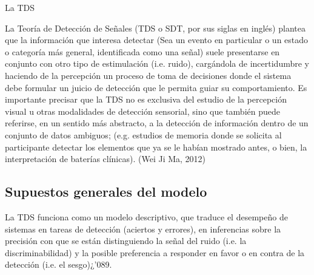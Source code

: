 La TDS 



La Teoría de Detección de Señales (TDS o SDT, por sus siglas en inglés) plantea que la información que  interesa  detectar  (Sea un evento en particular o un estado o categoría más general, identificada como una señal)  suele  presentarse  en  conjunto  con  otro  tipo  de  estimulación (i.e. ruido),  cargándola  de  incertidumbre  y  haciendo de  la  percepción  un  proceso  de  toma  de decisiones  donde  el  sistema  debe  formular  un  juicio  de  detección que  le  permita  guiar  su comportamiento. Es importante precisar  que la TDS no es exclusiva del estudio de la percepción visual  u  otras  modalidades  de  detección  sensorial,  sino  que  también  puede  referirse,  en  un sentido más abstracto, a la detección de información dentro de un conjunto de datos ambiguos; (e.g.  estudios  de  memoria  donde  se  solicita  al  participante  detectar  los  elementos  que  ya  se  le habían mostrado antes, o bien, la interpretación de baterías clínicas). (Wei Ji Ma, 2012)\\

\subsection{Supuestos generales del modelo}

La TDS funciona como un modelo descriptivo, que traduce el desempeño de sistemas en tareas de detección (aciertos y errores), en inferencias sobre la precisión con que se están distinguiendo la señal del ruido (i.e. la discriminabilidad) y la posible preferencia a responder en favor o en contra de la detección (i.e. el sesgo)¿'089.\\


